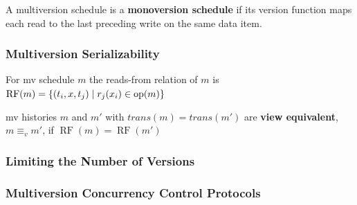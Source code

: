 \documentclass[11pt]{article}
\DeclareMathOperator{\RF}{\text{RF}}
\begin{document}
\begin{definition}[]
A multiversion schedule is a \textbf{monoversion schedule} if its version function maps each read to the
last preceding write on the same data item.
\end{definition}
\subsubsection{Multiversion Serializability}
\label{sec:orge37ed82}
\begin{definition}[]
For mv schedule \(m\) the reads-from relation of \(m\) is \(\RF(m)=\{(t_i,x,t_j)\mid r_j(x_i)\in\op(m)\}\)
\end{definition}

\begin{definition}[]
mv histories \(m\) and \(m'\) with \(trans(m)=trans(m')\) are \textbf{view equivalent}, \(m\equiv_vm'\), if \(\RF(m)=\RF(m')\)
\end{definition}
\subsubsection{Limiting the Number of Versions}
\label{sec:orgfe9a3a8}
\subsubsection{Multiversion Concurrency Control Protocols}
\label{sec:orgf73d878}
\end{document}
